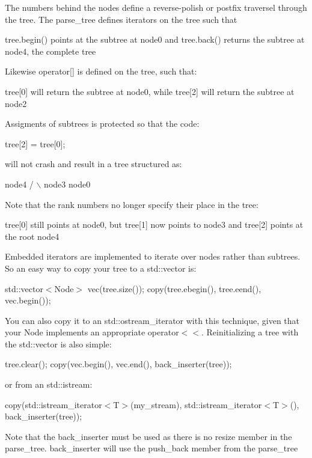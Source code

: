 The numbers behind the nodes define a reverse-polish or postfix traversel through the tree. The parse\_\-tree defines iterators on the tree such that

tree.begin() points at the subtree at node0 and tree.back() returns the subtree at node4, the complete tree

Likewise operator[] is defined on the tree, such that:

tree[0] will return the subtree at node0, while tree[2] will return the subtree at node2

Assigments of subtrees is protected so that the code:

tree[2] = tree[0];

will not crash and result in a tree structured as:

node4 / $\backslash$ node3 node0

Note that the rank numbers no longer specify their place in the tree:

tree[0] still points at node0, but tree[1] now points to node3 and tree[2] points at the root node4

Embedded iterators are implemented to iterate over nodes rather than subtrees. So an easy way to copy your tree to a std::vector is:

std::vector$<$Node$>$ vec(tree.size()); copy(tree.ebegin(), tree.eend(), vec.begin());

You can also copy it to an std::ostream\_\-iterator with this technique, given that your Node implements an appropriate operator$<$$<$. Reinitializing a tree with the std::vector is also simple:

tree.clear(); copy(vec.begin(), vec.end(), back\_\-inserter(tree));

or from an std::istream:

copy(std::istream\_\-iterator$<$T$>$(my\_\-stream), std::istream\_\-iterator$<$T$>$(), back\_\-inserter(tree));

Note that the back\_\-inserter must be used as there is no resize member in the parse\_\-tree. back\_\-inserter will use the push\_\-back member from the parse\_\-tree 

